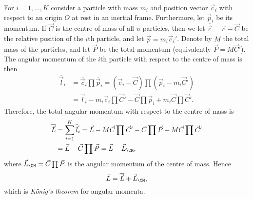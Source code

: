 \documentclass[article, a4paper, 11pt, oneside]{memoir}
\numberwithin{equation}{chapter}
\begin{document}
\begin{remarkbreak}
    For $i = 1, \ldots, K$ consider a particle with mass $m_i$ and position vector $\vec{c}_i$ with respect to an origin $O$ at rest in an inertial frame. Furthermore, let $\vec{p}_i$ be its momentum. If $\vec{C}$ is the centre of mass of all $n$ particles, then we let $\overline{\vec{c}} = \vec{c} - \vec{C}$ be the relative position of the $i$th particle, and let $\overline{\vec{p}} = m_i \overline{\vec{c}}_i'$. Denote by $M$ the total mass of the particles, and let $\vec{P}$ be the total momentum (equivalently $\vec{P} = M \vec{C}'$). The angular momentum of the $i$th particle with respect to the centre of mass is then
    \begin{align*}
        \overline{\vec{l}}_i
            &= \overline{\vec{c}}_i \prod \overline{\vec{p}}_i
             = (\vec{c}_i - \vec{C}) \prod (\vec{p}_i - m_i \vec{C}') \\
            &= \vec{l}_i - m_i \vec{c}_i \prod \vec{C}' - \vec{C} \prod \vec{p}_i + m_i \vec{C} \prod \vec{C}'.
    \end{align*}
    Therefore, the total angular momentum with respect to the centre of mass is
    \begin{align*}
        \overline{\vec{L}}
            &= \sum_{i=1}^K \overline{\vec{l}}_i
             = \vec{L} - M \vec{C} \prod \vec{C}' - \vec{C} \prod \vec{P} + M \vec{C} \prod \vec{C}' \\
            &= \vec{L} - \vec{C} \prod \vec{P}
             = \vec{L} - \vec{L}_\CM,
    \end{align*}
    where $\vec{L}_\CM = \vec{C} \prod \vec{P}$ is the angular momentum of the centre of mass. Hence
    \begin{equation*}
        \vec{L} = \overline{\vec{L}} + \vec{L}_\CM,
    \end{equation*}
    which is \emph{König's theorem} for angular momenta.
\end{remarkbreak}
\end{document}
